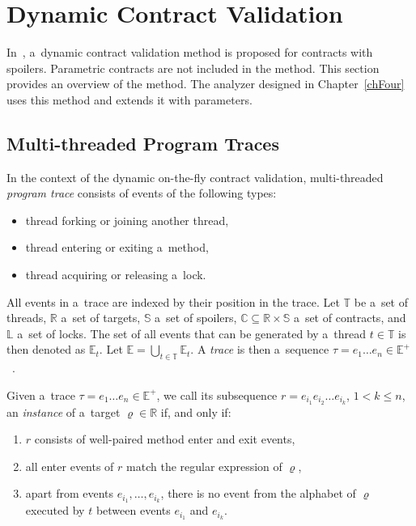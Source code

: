 \section{Dynamic Contract Validation}

In~\cite{contracts}, a~dynamic contract validation method is proposed for
contracts with spoilers. Parametric contracts are not included in the method.
This section provides an overview of the method. The analyzer designed in
Chapter~\ref{chFour} uses this method and extends it with parameters.

\subsection{Multi-threaded Program Traces}

In the context of the dynamic on-the-fly contract validation, multi-threaded
\emph{program trace} consists of events of the following types:
\begin{itemize}
    \item thread forking or joining another thread,
    \item thread entering or exiting a~method,
    \item thread acquiring or releasing a~lock.
\end{itemize}

All events in a~trace are indexed by their position in the trace. Let
$\mathbb{T}$ be a~set of threads, $\mathbb{R}$ a~set of targets, $\mathbb{S}$
a~set of spoilers, $\mathbb{C} \subseteq \mathbb{R} \times \mathbb{S}$ a~set of
contracts, and $\mathbb{L}$ a~set of locks. The set of all events that can be
generated by a~thread $t \in \mathbb{T}$ is then denoted as $\mathbb{E}_t$. Let
$\mathbb{E} = \bigcup_{t \in \mathbb{T}} \mathbb{E}_t$. A \emph{trace} is then
a~sequence $\tau = e_1 \hdots e_n \in \mathbb{E}^+$~\cite{contracts}.


Given a~trace $\tau = e_1 \hdots e_n \in \mathbb{E}^+$, we call its subsequence
$r = e_{i_1} e_{i_2} \hdots e_{i_k}$, $1 < k \leq n$, an \emph{instance} of
a~target $\varrho \in \mathbb{R}$ if, and only if:
\begin{enumerate}
    \item $r$ consists of well-paired method enter and exit events,
    \item all enter events of $r$ match the regular expression of $\varrho$,
    \item apart from events $e_{i_1},\ldots,e_{i_k}$, there is no event from the
        alphabet of $\varrho$ executed by $t$ between events $e_{i_1}$ and
        $e_{i_k}$.
\end{enumerate}

